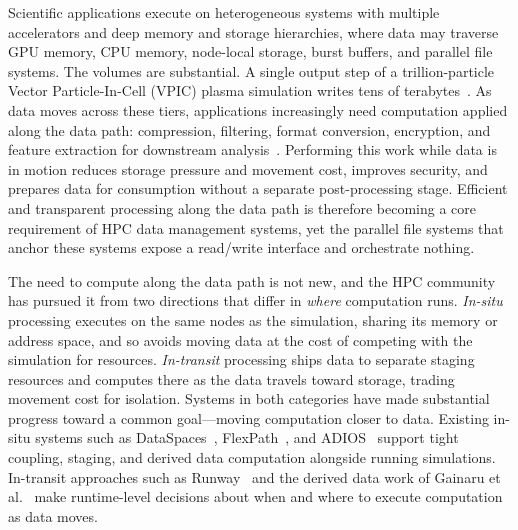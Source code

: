 Scientific applications execute on heterogeneous systems with multiple accelerators and deep memory and storage hierarchies, where data may traverse GPU memory, CPU memory, node-local storage, burst buffers, and parallel file systems. The volumes are substantial. A single output step of a trillion-particle Vector Particle-In-Cell (VPIC) plasma simulation writes tens of terabytes~\cite{byna2012trillion}. As data moves across these tiers, applications increasingly need computation applied along the data path: compression, filtering, format conversion, encryption, and feature extraction for downstream analysis~\cite{patwary2015bdcats, tan2022analysis}. Performing this work while data is in motion reduces storage pressure and movement cost, improves security, and prepares data for consumption without a separate post-processing stage. Efficient and transparent processing along the data path is therefore becoming a core requirement of HPC data management systems, yet the parallel file systems that anchor these systems expose a read/write interface and orchestrate nothing.

The need to compute along the data path is not new, and the HPC community has pursued it from two directions that differ in \emph{where} computation runs. \emph{In-situ} processing executes on the same nodes as the simulation, sharing its memory or address space, and so avoids moving data at the cost of competing with the simulation for resources. \emph{In-transit} processing ships data to separate staging resources and computes there as the data travels toward storage, trading movement cost for isolation. Systems in both categories have made substantial progress toward a common goal---moving computation closer to data. Existing in-situ systems such as DataSpaces~\cite{dataspaces}, FlexPath~\cite{flexpath}, and ADIOS~\cite{godoy2020adios2} support tight coupling, staging, and derived data computation alongside running simulations. In-transit approaches such as Runway~\cite{ravi2023runway} and the derived data work of Gainaru et al.~\cite{gainaru2024toderive} make runtime-level decisions about when and where to execute computation as data moves.

